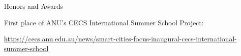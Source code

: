 \begin{rubric}{Honors and Awards}
\entry*[2018.01 -- 2018.01]
    \par First place of ANU's CECS International Summer School Project: \par \url{https://cecs.anu.edu.au/news/smart-cities-focus-inaugural-cecs-international-summer-school}
\end{rubric}